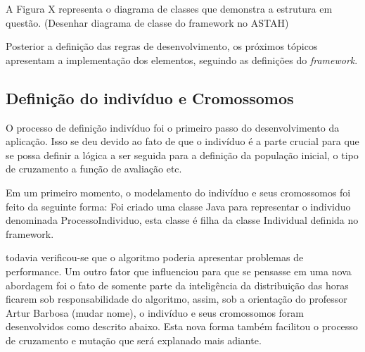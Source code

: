 A Figura X representa o diagrama de classes que demonstra a estrutura em questão.
(Desenhar diagrama de classe do framework no ASTAH)


\par Posterior a definição das regras de desenvolvimento, os próximos tópicos apresentam a implementação 
dos elementos, seguindo as definições do \textit{framework}.

\subsection{Definição do indivíduo e Cromossomos}
\par O processo de definição indivíduo foi o primeiro passo do desenvolvimento da aplicação. Isso 
se deu devido ao fato de que o indivíduo é a parte crucial para que se possa definir a lógica a ser seguida para
a definição da população inicial, o tipo de cruzamento a função de avaliação etc.


\par Em um primeiro momento, o modelamento do indivíduo e seus cromossomos foi feito da seguinte forma:
Foi criado uma classe Java para representar o individuo denominada ProcessoIndividuo, esta classe é filha 
da classe Individual definida no framework.


todavia verificou-se que o algoritmo poderia apresentar problemas de performance. Um outro fator que 
influenciou para que se pensasse em uma nova abordagem foi o fato de somente parte da inteligência da distribuição
das horas ficarem sob responsabilidade do algoritmo, assim, sob a orientação do professor Artur Barbosa (mudar nome), 
o indivíduo e seus cromossomos foram desenvolvidos como descrito abaixo. Esta nova forma também facilitou o processo 
de cruzamento e mutação que será explanado mais adiante.




	  
	
	
